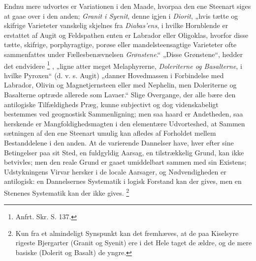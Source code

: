 \documentclass[12pt,a4paper]{book}
\renewcommand{\thefootnote}{*)}
\begin{document}
Endnu mere udvortes er Variationen i den Maade, hvorpaa den ene Steenart
siges at gaae over i den anden; \emph{Granit i Syenit}, denne igjen i
\emph{Diorit}, „hvis tætte og skifrige Varieteter vanskelig skjelnes fra
\emph{Diabas'ens}, i hvilke Hornblende er erstattet af Augit og
Feldspathen enten er Labrador eller Oligoklas, hvorfor disse tætte,
skifrige, porphyragtige, porøse eller mandelsteensagtige Varieteter ofte
sammenfattes under Fællesbenævnelsen \emph{Grønstene}.“ „Disse
Grønstene“, hedder det endvidere%
\renewcommand{\thefootnote}{***)}%
\footnote{%
Anfrt. Skr. S. 137.}%
\renewcommand{\thefootnote}{*)}%
, „ligne atter meget Melaphyrerne, \emph{Doleriterne og Basalterne}, i
hvilke Pyroxen“ (d. v. s. Augit) „danner Hovedmassen i Forbindelse med
Labrador, Olivin og Magnetjernsteen eller med Nephelin, men Doleriterne
og Basalterne optræde allerede som Lavaer.“ Slige Overgange, der alle
bære den antilogiske Tilfældigheds Præg, kunne subjectivt og dog
videnskabeligt bestemmes ved geognostisk Sammenligning; men saa haard er
Andetheden, saa herskende er Mangfoldighedsmagten i den elementære
Udvorteshed, at Sammen\-%
sætningen af den ene Steenart umulig kan afledes af Forholdet mellem
Bestanddelene i den anden. At de varierende Dannelser have, hver efter
sine Betingelser paa sit Sted, en fuldgyldig Aarsag, en tilstrækkelig
Grund, kan ikke betvivles; men den reale Grund er gaaet umiddelbart
sammen med sin Existens; Udstykningens Virvar hersker i de locale
Aarsager, og Nødvendigheden er antilogisk: en Dannelsernes Systematik i
logisk Forstand kan der gives, men en Stenenes Systematik kan der ikke
gives.%
\footnote{%
Kun fra et almindeligt Synspunkt kan det fremhæves, at de paa Kiselsyre
rigeste Bjergarter (Granit og Syenit) ere i det Hele taget de ældre, og
de mere basiske (Dolerit og Basalt) de yngre.}
\end{document}
